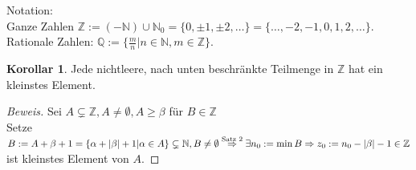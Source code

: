 \documentclass[12pt,a4paper,titlepage]{article} %
\theoremstyle{definition}
\newtheorem{kor}[satz]{Korollar}
\theoremstyle{remark}
\newenvironment{bew}{\begin{proof}[Beweis]}{\end{proof}}
\begin{document}
Notation:\\
Ganze Zahlen $\mathbb{Z} := (-\mathbb{N})\cup \mathbb{N}_0 = \{0, \pm 1, \pm 2, \ldots\} = \{\ldots, -2,-1,0,1,2,\ldots\}$.\\
Rationale Zahlen: $\mathbb{Q} := \{ \frac{m}{n} \vert n\in\mathbb{N}, m\in\mathbb{Z}\}$.
\begin{kor}
	Jede nichtleere, nach unten beschränkte Teilmenge in $\mathbb{Z}$ hat ein kleinstes Element. 
\end{kor}
\begin{bew}
	Sei $A\subsetneq \mathbb{Z}, A\neq \emptyset, A\geq \beta$ für $B\in\mathbb{Z}$\\
	Setze $B:= A+\beta +1 =\{\alpha+|\beta|+1\vert \alpha\in A\}\subsetneq \mathbb{N}, B\neq \emptyset\\
	\overset{\text{Satz 2}}{\Rightarrow} \exists n_0:= \min B \Rightarrow z_0 := n_0 - |\beta|-1\in\mathbb{Z}$ ist kleinstes Element von $A$.
\end{bew}
\end{document}
